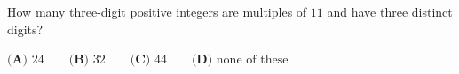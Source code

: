 How many three-digit positive integers are multiples of $11$ and have three distinct digits?

$\textbf{(A) }24\qquad\textbf{(B) }32\qquad\textbf{(C) }44\qquad\textbf{(D) }\text{none of these}$

